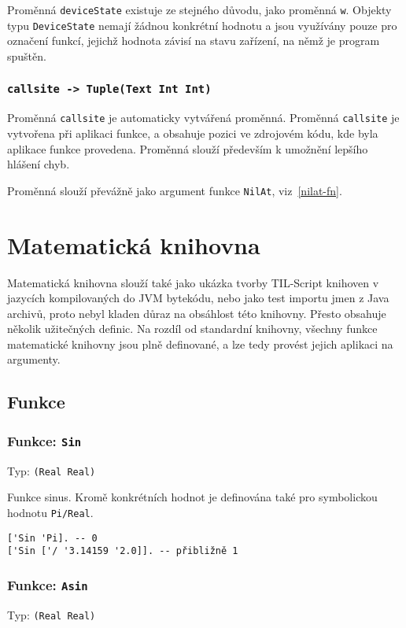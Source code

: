 Proměnná \lstinline{deviceState} existuje ze stejného důvodu, jako proměnná \lstinline{w}. Objekty
typu \lstinline{DeviceState} nemají žádnou konkrétní hodnotu a jsou využívány pouze pro označení
funkcí, jejichž hodnota závisí na stavu zařízení, na němž je program spuštěn.

\subsubsection{\lstinline{callsite -> Tuple(Text Int Int)}}\label{callsite-var}

Proměnná \lstinline{callsite} je automaticky vytvářená proměnná. Proměnná \lstinline{callsite}
je vytvořena při aplikaci funkce, a obsahuje pozici ve zdrojovém kódu, kde byla aplikace funkce
provedena. Proměnná slouží především k umožnění lepšího hlášení chyb.

Proměnná slouží převážně jako argument funkce \lstinline{NilAt}, viz~\ref{nilat-fn}.

\section{Matematická knihovna}

Matematická knihovna slouží také jako ukázka tvorby TIL-Script knihoven v jazycích kompilovaných
do JVM bytekódu, nebo jako test importu jmen z Java archivů, proto nebyl kladen důraz na obsáhlost
této knihovny. Přesto obsahuje několik užitečných definic. Na rozdíl od standardní knihovny, všechny
funkce matematické knihovny jsou plně definované, a lze tedy provést jejich aplikaci na argumenty.

\subsection{Funkce}

\subsubsection*{Funkce: \lstinline{Sin}}
Typ: \lstinline{(Real Real)}

Funkce sinus. Kromě konkrétních hodnot je definována také pro symbolickou hodnotu
\lstinline{Pi/Real}.

\begin{lstlisting}[caption={Ukázka využití Sin}]
['Sin 'Pi]. -- 0
['Sin ['/ '3.14159 '2.0]]. -- přibližně 1
\end{lstlisting}

\subsubsection*{Funkce: \lstinline{Asin}}
Typ: \lstinline{(Real Real)}


